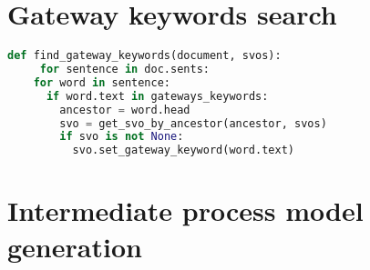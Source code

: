 \section{Gateway keywords search}
\begin{lstlisting}[language=Python, caption={Gateway keywords search function listing}, label={lst:gateway_extraction}]
def find_gateway_keywords(document, svos):
     for sentence in doc.sents:
    for word in sentence:
      if word.text in gateways_keywords:
        ancestor = word.head
        svo = get_svo_by_ancestor(ancestor, svos)
        if svo is not None:
          svo.set_gateway_keyword(word.text)
\end{lstlisting}

\section{Intermediate process model generation}
